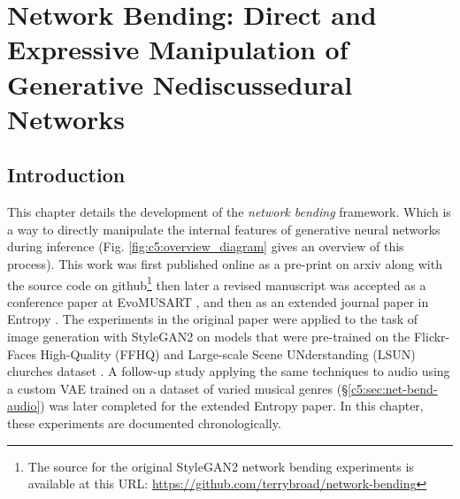 \chapter{Network Bending: Direct and Expressive Manipulation of Generative Nediscussedural Networks}
\label{ch:net_bend}

\section{Introduction}

This chapter details the development of the \textit{network bending} framework. 
Which is a way to directly manipulate the internal features of generative neural networks during inference (Fig. \ref{fig:c5:overview_diagram} gives an overview of this process). 
This work was first published online as a pre-print on arxiv \citep{broad2020network} along with the source code on github\footnote{The source for the original StyleGAN2 network bending experiments is available at this URL: \url{https://github.com/terrybroad/network-bending}} then later a revised manuscript was accepted as a conference paper at EvoMUSART \citep{broad2021network}, and then as an extended journal paper in Entropy \citep{broad2022network}.
The experiments in the original paper were applied to the task of image generation with StyleGAN2 on models that were pre-trained on the Flickr-Faces High-Quality (FFHQ) \citep{karras2019analyzing} and  Large-scale Scene UNderstanding (LSUN) churches dataset \citep{yu2015lsun}. 
A follow-up study applying the same techniques to audio using a custom VAE trained on a dataset of varied musical genres (\S \ref{c5:sec:net-bend-audio}) was later completed for the extended Entropy paper. 
In this chapter, these experiments are documented chronologically.


